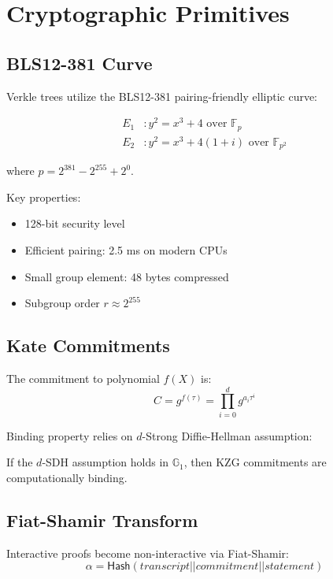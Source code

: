 \section{Cryptographic Primitives}


\subsection{BLS12-381 Curve}

Verkle trees utilize the BLS12-381 pairing-friendly elliptic curve:

\begin{align}
    E_1 &: y^2 = x^3 + 4 \text{ over } \mathbb{F}_p \\
    E_2 &: y^2 = x^3 + 4(1+i) \text{ over } \mathbb{F}_{p^2}
\end{align}

where $p = 2^{381} - 2^{255} + 2^0$.

Key properties:
\begin{itemize}
    \item 128-bit security level
    \item Efficient pairing: 2.5 ms on modern CPUs
    \item Small group element: 48 bytes compressed
    \item Subgroup order $r \approx 2^{255}$
\end{itemize}

\subsection{Kate Commitments}

The commitment to polynomial $f(X)$ is:
\begin{equation}
    C = g^{f(\tau)} = \prod_{i=0}^{d} g^{a_i \tau^i}
\end{equation}

Binding property relies on $d$-Strong Diffie-Hellman assumption:
\begin{theorem}
If the $d$-SDH assumption holds in $\mathbb{G}_1$, then KZG commitments are computationally binding.
\end{theorem}

\subsection{Fiat-Shamir Transform}

Interactive proofs become non-interactive via Fiat-Shamir:
\begin{equation}
    \alpha = \mathsf{Hash}(transcript || commitment || statement)
\end{equation}


